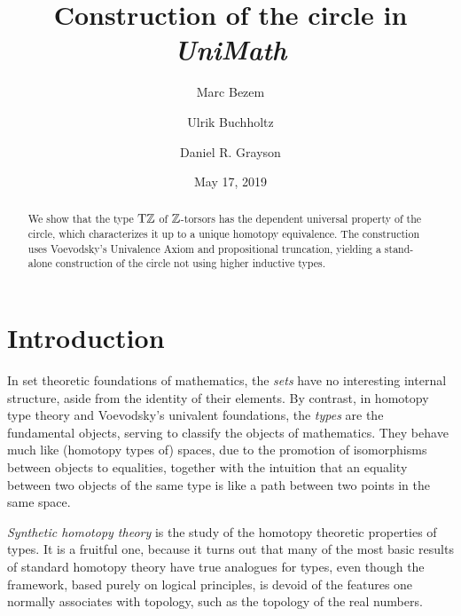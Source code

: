 \documentclass[a4paper,12pt]{amsart}
\begin{document}
\newcommand{\UniMath}{\emph{UniMath}}
\title{Construction of the circle in \UniMath}
{
    \author{Marc Bezem}
    \address{Department of Informatics, University of Bergen}
}
{
    \author{Ulrik Buchholtz}
    \address{Department of Mathematics, Technische Universit\"at Darmstadt}
}
{
    \author{Daniel R. Grayson}
}

\date{May 17, 2019}

\begin{abstract}
We show that the type ${\mathrm{T}\mathbb{Z}}$ of $\mathbb{Z}$-torsors has the dependent universal property of the circle, 
which characterizes it up to a unique homotopy equivalence.  
The construction uses Voevodsky's Univalence Axiom and propositional truncation, 
yielding a stand-alone construction of the
circle not using higher inductive types.
\end{abstract}

\maketitle
{}
\tableofcontents

\section{Introduction}

In set theoretic foundations of mathematics, the {\em sets} have no interesting internal structure, aside from the identity of their elements.
By contrast, in homotopy type theory and Voevodsky's univalent foundations, the {\em types} are the fundamental objects, serving to classify the
objects of mathematics.  They behave much like (homotopy types of) spaces, due to the promotion of isomorphisms between objects to
equalities, together with the intuition that an equality between two objects of the same type is like a path between two points in the same
space.

{\em Synthetic homotopy theory} is the study of the homotopy theoretic properties of types.  It is a fruitful one, because it turns out that
many of the most basic results of standard homotopy theory have true analogues for types, even though the framework, based purely on logical
principles, is devoid of the features one normally associates with topology, such as the topology of the real numbers.
\end{document}
